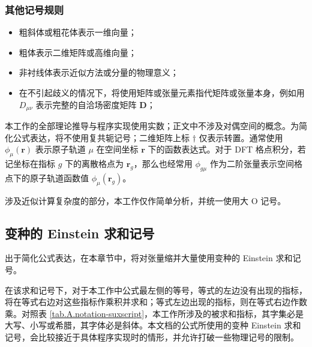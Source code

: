 \subsubsection{其他记号规则}

\begin{itemize}[nosep]
    \item 粗斜体或粗花体表示一维向量；
    \item 粗体表示二维矩阵或高维向量；
    \item 非衬线体表示近似方法或分量的物理意义；
    \item 在不引起歧义的情况下，将使用矩阵或张量元素指代矩阵或张量本身，例如用 $D_{\mu \nu}$ 表示完整的自洽场密度矩阵 $\mathbf{D}$；
\end{itemize}

本工作的全部理论推导与程序实现使用实数；正文中不涉及对偶空间的概念。为简化公式表达，将不使用复共轭记号；二维矩阵上标 $\dagger$ 仅表示转置。通常使用 $\phi_\mu (\bm{r})$ 表示原子轨道 $\mu$ 在空间坐标 $\bm{r}$ 下的函数表达式。对于 DFT 格点积分，若记坐标在指标 $g$ 下的离散格点为 $\bm{r}_g$，那么也经常用 $\phi_{g \mu}$ 作为二阶张量表示空间格点下的原子轨道函数值 $\phi_\mu (\bm{r}_g)$。

涉及近似计算复杂度的部分，本工作仅作简单分析，并统一使用大 O 记号。

\subsection{变种的 Einstein 求和记号}
\label{sec.3.einstein}

出于简化公式表达，在本章节中，将对张量缩并大量使用变种的 Einstein 求和记号\cite{Einstein-Einstein.AP.1916}。

在该求和记号下，对于本工作中公式最左侧的等号，等式的左边没有出现的指标，将在等式右边对这些指标作乘积并求和；等式左边出现的指标，则在等式右边作数乘。对照表 \ref{tab.A.notation-suxscript}，本工作所涉及的被求和指标，其字集必是大写、小写或希腊，其字体必是斜体。本文档的公式所使用的变种 Einstein 求和记号，会比较接近于具体程序实现时的情形，并允许打破一些物理记号的限制。

